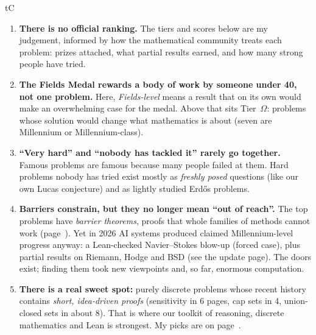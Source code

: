 \documentclass[10pt,a4paper]{article}
\begin{document}
\begin{keybox}[title={Five things to know before reading the list}]{tC}
\begin{enumerate}[leftmargin=1.3em]
\item \textbf{There is no official ranking.} The tiers and scores below are my judgement, informed by how the
  mathematical community treats each problem: prizes attached, what partial results earned, and how many
  strong people have tried.
\item \textbf{The Fields Medal rewards a body of work by someone under 40, not one problem.} Here,
  \emph{Fields-level} means a result that on its own would make an overwhelming case for the medal. Above that
  sits Tier~$\Omega$: problems whose solution would change what mathematics is about (seven are Millennium or
  Millennium-class).
\item \textbf{``Very hard'' and ``nobody has tackled it'' rarely go together.} Famous problems are famous
  because many people failed at them. Hard problems nobody has tried exist mostly as \emph{freshly posed}
  questions (like our own Lucas conjecture) and as lightly studied Erd\H{o}s problems.
\item \textbf{Barriers constrain, but they no longer mean ``out of reach''.} The top problems have
  \emph{barrier theorems}, proofs that whole families of methods cannot work (page~\pageref{sec:honest}). Yet in
  2026 AI systems produced claimed Millennium-level progress anyway: a Lean-checked Navier--Stokes blow-up (forced
  case), plus partial results on Riemann, Hodge and BSD (see the update page). The doors exist; finding them took
  new viewpoints and, so far, enormous computation.
\item \textbf{There is a real sweet spot:} purely discrete problems whose recent history contains \emph{short,
  idea-driven proofs} (sensitivity in 6 pages, cap sets in 4, union-closed sets in about 8). That is where our
  toolkit of reasoning, discrete mathematics and Lean is strongest. My picks are on page~\pageref{sec:picks}.
\end{enumerate}
\end{keybox}
\end{document}
